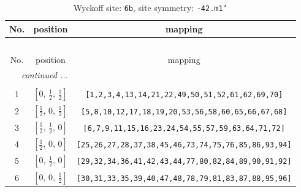 \documentclass[fleqn,8pt]{jsarticle}
\begin{document}
\begin{longtable}{ccc}
\caption{Wyckoff site: {\tt 6b}, site symmetry: {\tt -42.m1'}}
 \\
 \hline \hline
No. & position & mapping \\ \hline \endfirsthead

\multicolumn{2}{l}{\tablename\ \thetable{}} \\
 \hline \hline
No. & position & mapping \\ \hline \endhead

 \hline \hline
\multicolumn{2}{r}{\footnotesize\it continued ...} \\ \endfoot

 \hline \hline
\multicolumn{2}{r}{} \\ \endlastfoot

1 & $\left[ 0,\, \frac{1}{2},\, \frac{1}{2} \right]$ & {\tt [1,2,3,4,13,14,21,22,49,50,51,52,61,62,69,70]} \\ \hline
2 & $\left[ \frac{1}{2},\, 0,\, \frac{1}{2} \right]$ & {\tt [5,8,10,12,17,18,19,20,53,56,58,60,65,66,67,68]} \\ \hline
3 & $\left[ \frac{1}{2},\, \frac{1}{2},\, 0 \right]$ & {\tt [6,7,9,11,15,16,23,24,54,55,57,59,63,64,71,72]} \\ \hline
4 & $\left[ \frac{1}{2},\, 0,\, 0 \right]$ & {\tt [25,26,27,28,37,38,45,46,73,74,75,76,85,86,93,94]} \\ \hline
5 & $\left[ 0,\, \frac{1}{2},\, 0 \right]$ & {\tt [29,32,34,36,41,42,43,44,77,80,82,84,89,90,91,92]} \\ \hline
6 & $\left[ 0,\, 0,\, \frac{1}{2} \right]$ & {\tt [30,31,33,35,39,40,47,48,78,79,81,83,87,88,95,96]} \\
\end{longtable}
\renewcommand{\arraystretch}{1.2}
\end{document}
